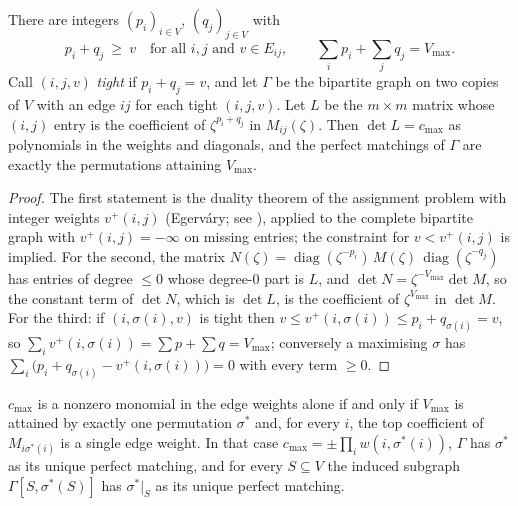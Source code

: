 \begin{lemma}\label{lem:potentials}
There are integers $(p_i)_{i\in V}$, $(q_j)_{j\in V}$ with
\[
  p_i+q_j\ \ge\ v\quad\text{for all }i,j\text{ and }v\in E_{ij},
  \qquad \sum_i p_i+\sum_j q_j=V_{\max}.
\]
Call $(i,j,v)$ \emph{tight} if $p_i+q_j=v$, and let $\Gamma$ be the bipartite
graph on two copies of $V$ with an edge $ij$ for each tight $(i,j,v)$. Let $L$
be the $m\times m$ matrix whose $(i,j)$ entry is the coefficient of
$\zeta^{p_i+q_j}$ in $M_{ij}(\zeta)$. Then $\det L=c_{\max}$ as polynomials in
the weights and diagonals, and the perfect matchings of $\Gamma$ are exactly
the permutations attaining $V_{\max}$.
\end{lemma}

\begin{proof}
The first statement is the duality theorem of the assignment problem with
integer weights $v^+(i,j)$ (Egerv\'ary; see \cite[Ch.~17]{schrijver}),
applied to the complete bipartite graph with $v^+(i,j)=-\infty$ on missing
entries; the constraint for $v<v^+(i,j)$ is implied. For the second, the matrix
$N(\zeta)=\operatorname{diag}(\zeta^{-p_i})\,M(\zeta)\,\operatorname{diag}(\zeta^{-q_j})$
has entries of degree $\le0$ whose degree-$0$ part is $L$, and
$\det N=\zeta^{-V_{\max}}\det M$, so the constant term of $\det N$, which is
$\det L$, is the coefficient of $\zeta^{V_{\max}}$ in $\det M$. For the third:
if $(i,\sigma(i),v)$ is tight then $v\le v^+(i,\sigma(i))\le p_i+q_{\sigma(i)}=v$,
so $\sum_iv^+(i,\sigma(i))=\sum p+\sum q=V_{\max}$; conversely a maximising
$\sigma$ has $\sum_i\bigl(p_i+q_{\sigma(i)}-v^+(i,\sigma(i))\bigr)=0$ with every
term $\ge0$.
\end{proof}

\begin{lemma}\label{lem:monomial}
$c_{\max}$ is a nonzero monomial in the edge weights alone if and only if
$V_{\max}$ is attained by exactly one permutation $\sigma^*$ and, for every
$i$, the top coefficient of $M_{i\sigma^*(i)}$ is a single edge weight. In that
case $c_{\max}=\pm\prod_iw(i,\sigma^*(i))$, $\Gamma$ has $\sigma^*$ as its
unique perfect matching, and for every $S\subseteq V$ the induced subgraph
$\Gamma[S,\sigma^*(S)]$ has $\sigma^*|_S$ as its unique perfect matching.
\end{lemma}

